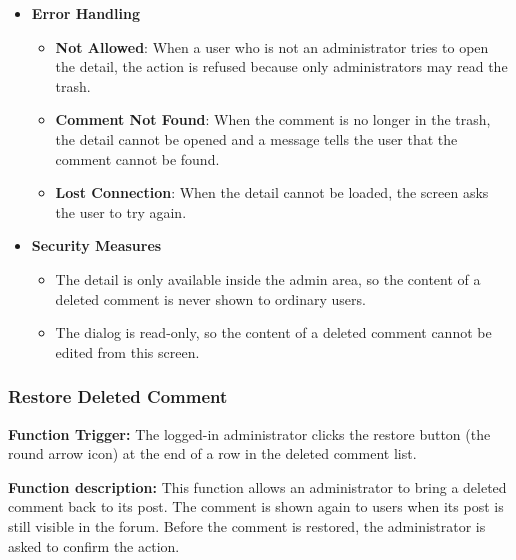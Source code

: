 \begin{itemize}[leftmargin=1.6em,topsep=4pt,itemsep=3pt,parsep=0pt,label=$\bullet$]
        \begin{itemize}[leftmargin=2.2em,topsep=2pt,itemsep=3pt,parsep=0pt,label=$\circ$]
            \item The administrator has read the complete comment and knows to which post it belongs.
            \item Nothing has changed while only viewing the comment.
        \end{itemize}
    \item \textbf{Error Handling}
        \begin{itemize}[leftmargin=2.2em,topsep=2pt,itemsep=3pt,parsep=0pt,label=$\circ$]
            \item \textbf{Not Allowed}: When a user who is not an administrator tries to open the detail, the action is refused because only administrators may read the trash.
            \item \textbf{Comment Not Found}: When the comment is no longer in the trash, the detail cannot be opened and a message tells the user that the comment cannot be found.
            \item \textbf{Lost Connection}: When the detail cannot be loaded, the screen asks the user to try again.
        \end{itemize}
    \item \textbf{Security Measures}
        \begin{itemize}[leftmargin=2.2em,topsep=2pt,itemsep=3pt,parsep=0pt,label=$\circ$]
            \item The detail is only available inside the admin area, so the content of a deleted comment is never shown to ordinary users.
            \item The dialog is read-only, so the content of a deleted comment cannot be edited from this screen.
        \end{itemize}
\end{itemize}


\subsubsection{Restore Deleted Comment}

\textbf{Function Trigger:} The logged-in administrator clicks the restore button (the round arrow icon) at the end of a row in the deleted comment list.

\textbf{Function description:} This function allows an administrator to bring a deleted comment back to its post. The comment is shown again to users when its post is still visible in the forum. Before the comment is restored, the administrator is asked to confirm the action.

